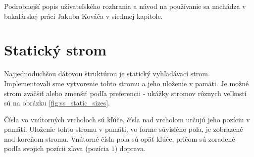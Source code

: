 Podrobnejší popis užívateľského rozhrania a návod na používanie sa nachádza v bakalárskej práci Jakuba Kováča \citep{algviskuko} v siedmej kapitole.

\section{Statický strom}
Najjednoduchšou dátovou štruktúrou je statický vyhľadávací strom. Implementovali sme vytvorenie tohto stromu a jeho uloženie v pamäti. Je možné strom zväčšiť alebo zmenšiť podľa preferencii - ukážky stromov rôznych veľkostí sú na obrázku \ref{fig:ss_static_sizes}.

Čísla vo vnútorných vrcholoch sú kľúče, čísla nad vrcholom určujú jeho pozíciu v pamäti. Uloženie tohto stromu v pamäti, vo forme súvislého poľa, je zobrazené nad koreňom stromu. Vnútorné čísla poľa sú opäť kľúče, pričom sú zoradené podľa svojich pozícii zľava (pozícia $1$) doprava.

